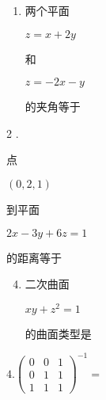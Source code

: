 \documentclass[10pt]{article}
\begin{document}
\begin{enumerate}
  \item \begin{CJK}{UTF8}{mj}两个平面\end{CJK} $z=x+2 y$ \begin{CJK}{UTF8}{mj}和\end{CJK} $z=-2 x-y$ \begin{CJK}{UTF8}{mj}的夹角等于\end{CJK}
\end{enumerate}
2 . \begin{CJK}{UTF8}{mj}点\end{CJK} $(0,2,1)$ \begin{CJK}{UTF8}{mj}到平面\end{CJK} $2 x-3 y+6 z=1$ \begin{CJK}{UTF8}{mj}的距离等于\end{CJK}

\begin{enumerate}
  \setcounter{enumi}{3}
  \item \begin{CJK}{UTF8}{mj}二次曲面\end{CJK} $x y+z^{2}=1$ \begin{CJK}{UTF8}{mj}的曲面类型是\end{CJK}
\end{enumerate}
$4 .\left(\begin{array}{lll}0 & 0 & 1 \\ 0 & 1 & 1 \\ 1 & 1 & 1\end{array}\right)^{-1}=$
\end{document}
